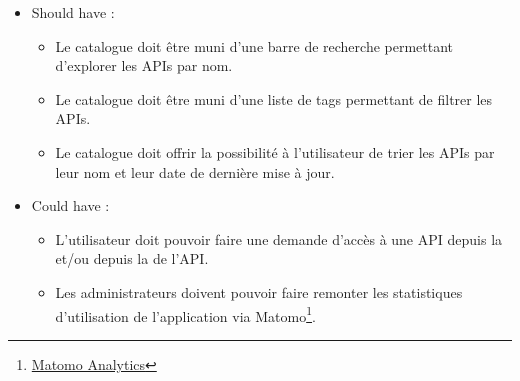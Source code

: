 \begin{itemize}
\begin{itemize}
        \item[$\circ$] Les administrateurs doivent pouvoir forcer la mise à jour des  de toutes les APIs à tout moment.
        \item[$\circ$] Les administrateurs doivent pouvoir consulter les logs montrant les erreurs du programme, les connections des administrateurs ainsi que les modifications qu'ils ont effectués.
        \item[$\circ$] Les logs doivent être descriptifs et pouvoir montrer aux administrateurs l'origine de chaque message présent dans les logs (, , ).
    \end{itemize}
    \item[$\bullet$] Should have : %
    \begin{itemize}
        \item[$\circ$] Le catalogue doit être muni d'une barre de recherche permettant d'explorer les APIs par nom.
        \item[$\circ$] Le catalogue doit être muni d'une liste de tags permettant de filtrer les APIs.
        \item[$\circ$] Le catalogue doit offrir la possibilité à l'utilisateur de trier les APIs par leur nom et leur date de dernière mise à jour.
    \end{itemize}
    \item[$\bullet$] Could have :
    \begin{itemize}
        \item[$\circ$] L'utilisateur doit pouvoir faire une demande d'accès à une API depuis la  et/ou depuis la  de l'API.
        \item[$\circ$] Les administrateurs doivent pouvoir faire remonter les statistiques d'utilisation de l'application via Matomo\footnote{\href{https://matomo.org/get/matomo_analytics/}{Matomo Analytics}}.
    \end{itemize}
\end{itemize}



